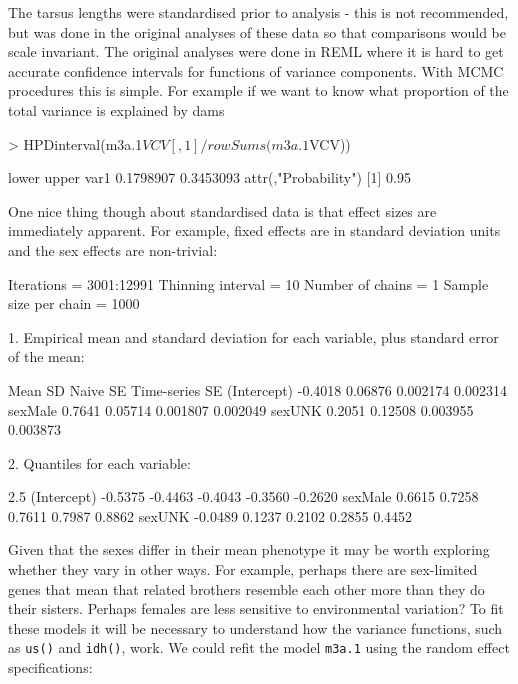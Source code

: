\documentclass{article}
\begin{document}
The tarsus lengths were standardised prior to analysis - this is not recommended, but was done in the original analyses of these data \citep{Hadfield.2007} so that comparisons would be scale invariant. The original analyses were done in REML where it is hard to get accurate confidence intervals for functions of variance components.  With MCMC procedures this is simple. For example if we want to know what proportion of the total variance is explained by dams 

\begin{Schunk}
\begin{Sinput}
> HPDinterval(m3a.1$VCV[, 1]/rowSums(m3a.1$VCV))
\end{Sinput}
\begin{Soutput}
         lower     upper
var1 0.1798907 0.3453093
attr(,"Probability")
[1] 0.95
\end{Soutput}
\end{Schunk}

One nice thing though about standardised data is that effect sizes are immediately apparent. For example, fixed effects are in standard deviation units and the sex effects are non-trivial:

\begin{Schunk}
\begin{Soutput}
Iterations = 3001:12991
Thinning interval = 10 
Number of chains = 1 
Sample size per chain = 1000 

1. Empirical mean and standard deviation for each variable,
   plus standard error of the mean:

               Mean      SD Naive SE Time-series SE
(Intercept) -0.4018 0.06876 0.002174       0.002314
sexMale      0.7641 0.05714 0.001807       0.002049
sexUNK       0.2051 0.12508 0.003955       0.003873

2. Quantiles for each variable:

               2.5%
(Intercept) -0.5375 -0.4463 -0.4043 -0.3560 -0.2620
sexMale      0.6615  0.7258  0.7611  0.7987  0.8862
sexUNK      -0.0489  0.1237  0.2102  0.2855  0.4452
\end{Soutput}
\end{Schunk}

Given that the sexes differ in their mean phenotype it may be worth exploring whether they vary in other ways. For example, perhaps there are sex-limited genes that mean that related brothers resemble each other more than they do their sisters. Perhaps females are less sensitive to environmental variation? To fit these models it will be necessary to understand how the variance functions, such as \texttt{us()} and \texttt{idh()}, work.  We could refit the model \texttt{m3a.1} using the random effect specifications:
\end{document}
